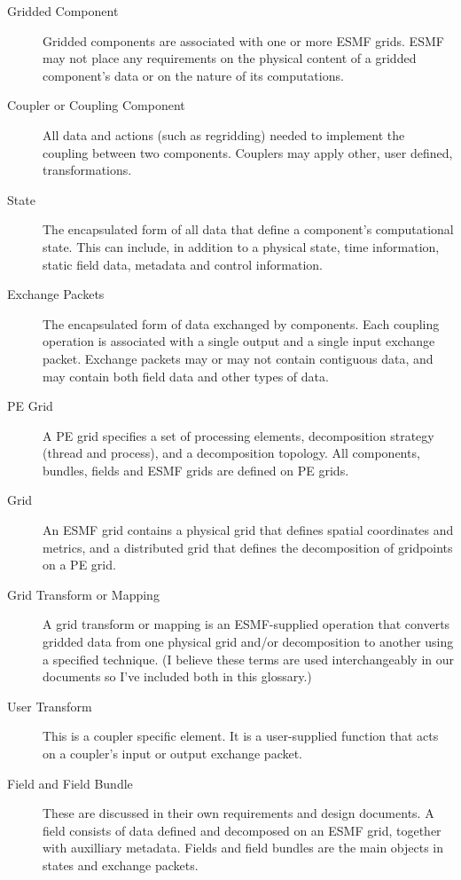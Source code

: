 
\begin{description}

\item [Gridded Component] \label{glos:GC}
Gridded components are associated with one or more ESMF 
grids.  ESMF may not place any requirements  on the physical content of a
gridded component's data or on the nature of its computations. 

\item [Coupler or Coupling Component] \label{glos:Cplr}
All data and actions (such as regridding) needed to implement the
coupling between two components.  Couplers may apply other, user 
defined, transformations. 

\item [State] \label{glos:State} The encapsulated form of all data that
define a component's computational state. This can include,
in addition to a physical state,  time information, static field data,
metadata and control information. 

\item [Exchange Packets] \label{glos:EP} The encapsulated form of 
data exchanged by components.  Each coupling operation is 
associated with a single output and a single input exchange packet.
Exchange packets may or may not contain contiguous data, and may 
contain both field data and other types of data.

\item [PE Grid] \label{glos:PEGrid} A PE grid specifies a set of 
processing elements, decomposition strategy (thread and process), and 
a decomposition topology.  All components, bundles, fields and ESMF
grids are defined on PE grids.

\item [Grid] An ESMF grid contains a physical grid 
that defines spatial coordinates and metrics, and a distributed grid that 
defines the decomposition of gridpoints on a PE grid.

\item [Grid Transform or Mapping] \label{glos:GrdTrans} A grid transform 
or mapping is an ESMF-supplied operation that converts gridded data 
from one physical grid and/or decomposition to another using a specified 
technique.  (I believe these terms are used interchangeably in our documents 
so I've included both in this glossary.)

\item [User Transform] \label{glos:UsrTrans} This is a coupler specific
element. It is a user-supplied function that acts on a coupler's
input or output exchange packet.

\item [Field and Field Bundle] These are discussed in their own 
requirements and design documents. A field consists of data defined 
and decomposed on an ESMF grid, together with auxilliary metadata. 
Fields and field bundles are the main objects in states and exchange 
packets.

\end{description}





